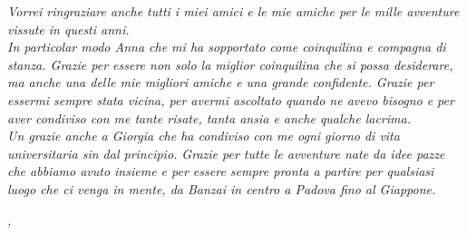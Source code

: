 \noindent \textit{Vorrei ringraziare anche tutti i miei amici e le mie amiche per le mille avventure vissute in questi anni.} \\
\noindent \textit{In particolar modo Anna che mi ha sopportato come coinquilina e compagna di stanza. Grazie per essere non solo la miglior coinquilina che si possa desiderare, ma anche una delle mie migliori amiche e una grande confidente. Grazie per essermi sempre stata vicina, per avermi ascoltato quando ne avevo bisogno e per aver condiviso con me tante risate, tanta ansia e anche qualche lacrima.}\\                                                                                                
\noindent \textit{Un grazie anche a Giorgia che ha condiviso con me ogni giorno di vita universitaria sin dal principio. Grazie per tutte le avventure nate da idee pazze che abbiamo avuto insieme e per essere sempre pronta a partire per qualsiasi luogo che ci venga in mente, da Banzai in centro a Padova fino al Giappone.}\\
\bigskip

\noindent\textit{\myLocation, \myTime}
\hfill \myName

\endgroup
